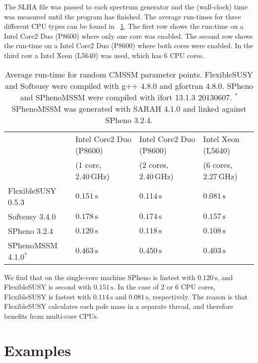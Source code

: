 \documentclass[final,3p,times,pdflatex]{elsarticle}
\newcommand{\unit}[1]{\,\text{#1}}      %
\begin{document}
%
The SLHA file was passed to each spectrum generator and the
(wall-clock) time was measured until the program has finished.  The
average run-times for three different CPU types can be found in
\tablename~\ref{tab:run-time-comparison}.  The first row shows the
run-time on a Intel Core2 Duo (P8600) where only one core was enabled.
The second row shows the run-time on a Intel Core2 Duo (P8600) where
both cores were enabled.  In the third row a Intel Xeon (L5640) was
used, which has $6$ CPU cores.
%
\begin{table}[tbh]
  \centering
  \begin{tabular}{llll}
    \toprule
                          & Intel Core2 Duo (P8600)    & Intel Core2 Duo (P8600)     & Intel Xeon (L5640)\\
                          & (1 core, $2.40\unit{GHz}$) & (2 cores, $2.40\unit{GHz}$) & (6 cores, $2.27\unit{GHz}$)\\
    \midrule
    FlexibleSUSY 0.5.3    & $0.151\unit{s}$    & $0.114\unit{s}$   & $0.081\unit{s}$\\
    Softsusy 3.4.0        & $0.178\unit{s}$    & $0.174\unit{s}$   & $0.157\unit{s}$\\
    SPheno 3.2.4          & $0.120\unit{s}$    & $0.118\unit{s}$   & $0.108\unit{s}$\\
    SPhenoMSSM 4.1.0${}^*$ & $0.463\unit{s}$    & $0.450\unit{s}$   & $0.403\unit{s}$\\
    \bottomrule
  \end{tabular}
  \caption{Average run-time for random CMSSM parameter points.
    FlexibleSUSY and Softsusy were compiled
    with g++ 4.8.0 and gfortran 4.8.0.  SPheno and SPhenoMSSM were
    compiled with ifort 13.1.3 20130607.
    ${}^*$ SPhenoMSSM was generated with SARAH 4.1.0 and linked
    against SPheno 3.2.4.}
  \label{tab:run-time-comparison}
\end{table}
%
We find that on the single-core machine SPheno is fastest with
$0.120\unit{s}$, and FlexibleSUSY is second with $0.151\unit{s}$.  In
the case of 2 or 6 CPU cores, FlexibleSUSY is fastest with
$0.114\unit{s}$ and $0.081\unit{s}$, respectively.  The reason is that
FlexibleSUSY calculates each pole mass in a separate thread, and
therefore benefits from multi-core CPUs.

\appendix
\section{Examples}
\end{document}
